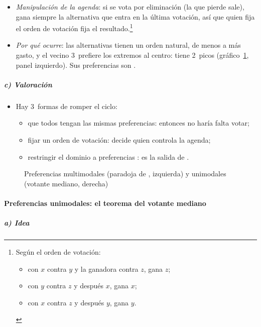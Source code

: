 \documentclass[11pt]{article}
\begin{document}
\begin{itemize}
\item \emph{Manipulación de la agenda}: si se vota por eliminación (la que pierde sale), gana siempre la alternativa que entra en la última votación, así que quien fija el orden de votación fija el resultado.\footnote{Según el orden de votación:
\begin{itemize}
\item con $x$ contra $y$ y la ganadora contra $z$, gana $z$;
\item con $y$ contra $z$ y después $x$, gana $x$;
\item con $x$ contra $z$ y después $y$, gana $y$.
\end{itemize}}
\item \emph{Por qué ocurre}: las alternativas tienen un orden natural, de menos a más gasto, y el vecino 3~prefiere los extremos al centro: tiene 2~picos (gráfico~\ref{fig:condorcet}, panel izquierdo). Sus preferencias son .
\end{itemize}

\subparagraph{c) Valoración}

\begin{itemize}
\item Hay 3~formas de romper el ciclo:
  \begin{itemize}
  \item que todos tengan las mismas preferencias: entonces no haría falta votar;
  \item fijar un orden de votación: decide quien controla la agenda;
  \item restringir el dominio a preferencias : es la salida de \textcite{Black1948Rationale}.
  \end{itemize}
\end{itemize}

\begin{figure}[H]
\centering
\caption{Preferencias multimodales (paradoja de , izquierda) y unimodales (votante mediano, derecha)}\label{fig:condorcet}
\end{figure}

\paragraph{Preferencias unimodales: el teorema del votante mediano}

\subparagraph{a) Idea}
\end{document}
